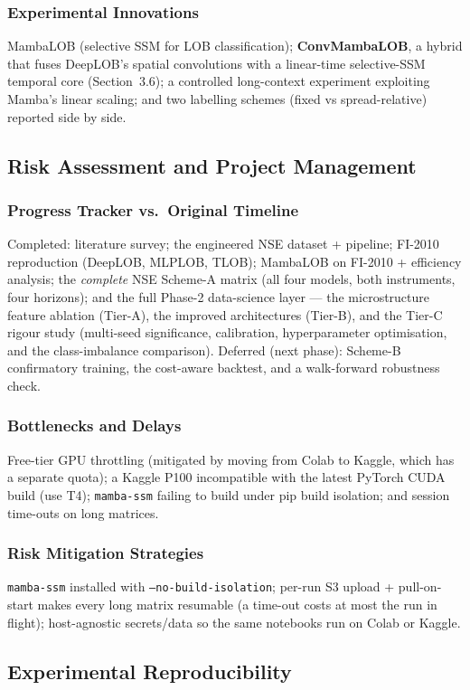 \documentclass[11pt]{article}
\begin{document}
\subsubsection{Experimental Innovations}
MambaLOB (selective SSM for LOB classification); \textbf{ConvMambaLOB}, a hybrid that fuses DeepLOB's spatial
convolutions with a linear-time selective-SSM temporal core (Section~3.6); a controlled long-context
experiment exploiting Mamba's linear scaling; and two labelling schemes (fixed vs spread-relative) reported
side by side.

\subsection{Risk Assessment and Project Management}
\subsubsection{Progress Tracker vs.\ Original Timeline}
Completed: literature survey; the engineered NSE dataset + pipeline; FI-2010 reproduction (DeepLOB, MLPLOB,
TLOB); MambaLOB on FI-2010 + efficiency analysis; the \emph{complete} NSE Scheme-A matrix (all four models,
both instruments, four horizons); and the full Phase-2 data-science layer --- the microstructure feature
ablation (Tier-A), the improved architectures (Tier-B), and the Tier-C rigour study (multi-seed significance,
calibration, hyperparameter optimisation, and the class-imbalance comparison). Deferred (next phase):
Scheme-B confirmatory training, the cost-aware backtest, and a walk-forward robustness check.
\subsubsection{Bottlenecks and Delays}
Free-tier GPU throttling (mitigated by moving from Colab to Kaggle, which has a separate quota); a Kaggle
P100 incompatible with the latest PyTorch CUDA build (use T4); \texttt{mamba-ssm} failing to build under
pip build isolation; and session time-outs on long matrices.
\subsubsection{Risk Mitigation Strategies}
\texttt{mamba-ssm} installed with \texttt{--no-build-isolation}; per-run S3 upload + pull-on-start makes
every long matrix resumable (a time-out costs at most the run in flight); host-agnostic secrets/data so the
same notebooks run on Colab or Kaggle.

\subsection{Experimental Reproducibility}
\end{document}
